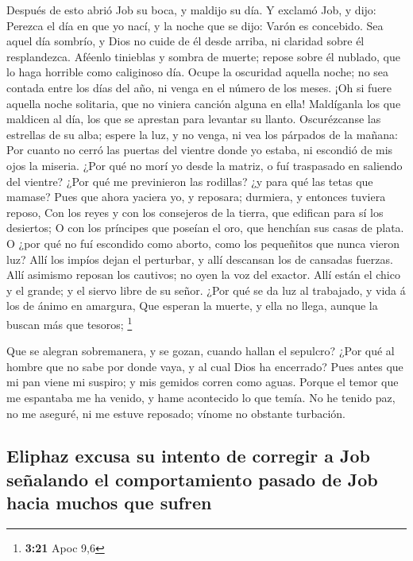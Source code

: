  Después de esto abrió Job su boca, y maldijo su día.
 Y exclamó Job, y dijo:  Perezca el día en que
yo nací, y la noche que se dijo: Varón es concebido.  Sea
aquel día sombrío, y Dios no cuide de él desde arriba, ni claridad sobre
él resplandezca.  Aféenlo tinieblas y sombra de muerte;
repose sobre él nublado, que lo haga horrible como caliginoso día.
 Ocupe la oscuridad aquella noche; no sea contada entre los
días del año, ni venga en el número de los meses.  ¡Oh si
fuere aquella noche solitaria, que no viniera canción alguna en ella!
 Maldíganla los que maldicen al día, los que se aprestan
para levantar su llanto.  Oscurézcanse las estrellas de su
alba; espere la luz, y no venga, ni vea los párpados de la mañana:
 Por cuanto no cerró las puertas del vientre donde yo
estaba, ni escondió de mis ojos la miseria.  ¿Por qué no
morí yo desde la matriz, o fuí traspasado en saliendo del vientre?
 ¿Por qué me previnieron las rodillas? ¿y para qué las
tetas que mamase?  Pues que ahora yaciera yo, y reposara;
durmiera, y entonces tuviera reposo,  Con los reyes y con
los consejeros de la tierra, que edifican para sí los desiertos;
 O con los príncipes que poseían el oro, que henchían sus
casas de plata.  O ¿por qué no fuí escondido como aborto,
como los pequeñitos que nunca vieron luz?  Allí los impíos
dejan el perturbar, y allí descansan los de cansadas fuerzas.
 Allí asimismo reposan los cautivos; no oyen la voz del
exactor.  Allí están el chico y el grande; y el siervo
libre de su señor.  ¿Por qué se da luz al trabajado, y vida
á los de ánimo en amargura,  Que esperan la muerte, y ella
no llega, aunque la buscan más que tesoros; \footnote{\textbf{3:21} Apoc
  9,6}

 Que se alegran sobremanera, y se gozan, cuando hallan el
sepulcro?  ¿Por qué al hombre que no sabe por donde vaya, y
al cual Dios ha encerrado?  Pues antes que mi pan viene mi
suspiro; y mis gemidos corren como aguas.  Porque el temor
que me espantaba me ha venido, y hame acontecido lo que temía.
 No he tenido paz, no me aseguré, ni me estuve reposado;
vínome no obstante turbación.

\hypertarget{eliphaz-excusa-su-intento-de-corregir-a-job-seuxf1alando-el-comportamiento-pasado-de-job-hacia-muchos-que-sufren}{%
\subsection{Eliphaz excusa su intento de corregir a Job señalando el
comportamiento pasado de Job hacia muchos que
sufren}\label{eliphaz-excusa-su-intento-de-corregir-a-job-seuxf1alando-el-comportamiento-pasado-de-job-hacia-muchos-que-sufren}}

